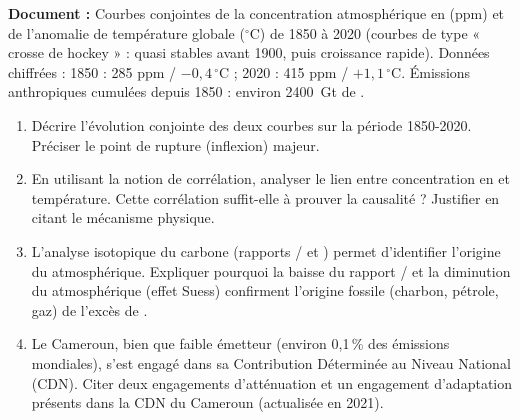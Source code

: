 \documentclass[11pt]{article}
\begin{document}
\begin{exercice}
\textbf{Document :} Courbes conjointes de la concentration atmosphérique en  (ppm) et de l'anomalie de température globale ($^\circ$C) de 1850 à 2020 (courbes de type « crosse de hockey » : quasi stables avant 1900, puis croissance rapide). Données chiffrées : 1850 : 285 ppm / $-0{,}4\,^\circ$C ; 2020 : 415 ppm / $+1{,}1\,^\circ$C. Émissions anthropiques cumulées depuis 1850 : environ \SI{2400}{Gt} de .

\begin{enumerate}
    \item Décrire l'évolution conjointe des deux courbes sur la période 1850-2020. Préciser le point de rupture (inflexion) majeur.
    \item En utilisant la notion de corrélation, analyser le lien entre concentration en  et température. Cette corrélation suffit-elle à prouver la causalité ? Justifier en citant le mécanisme physique.
    \item L'analyse isotopique du carbone (rapports / et ) permet d'identifier l'origine du  atmosphérique. Expliquer pourquoi la baisse du rapport / et la diminution du  atmosphérique (effet Suess) confirment l'origine fossile (charbon, pétrole, gaz) de l'excès de .
    \item Le Cameroun, bien que faible émetteur (environ 0,1\,\% des émissions mondiales), s'est engagé dans sa Contribution Déterminée au Niveau National (CDN). Citer deux engagements d'atténuation et un engagement d'adaptation présents dans la CDN du Cameroun (actualisée en 2021).
\end{enumerate}
\end{exercice}
\end{document}
